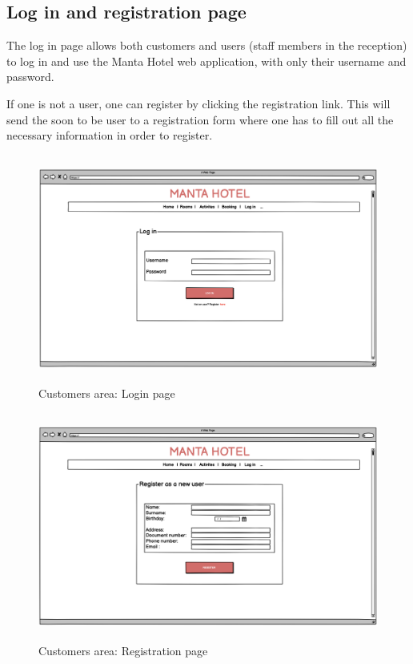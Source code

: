 \subsection{Log in and registration page}
\par The log in page allows both customers and users (staff members in the reception) to log in and use the Manta Hotel web application, with only their username and password. 
\par If one is not a user, one can register by clicking the registration link. This will send the soon to be user to a registration form where one has to fill out all the necessary information in order to register. 
\begin{figure}[H]
	\centering
	\includegraphics[height=7.5cm]{images/HomePage_Login.png} 
	\caption{Customers area: Login page}
\end{figure}
\begin{figure}[H]
	\centering
	\includegraphics[height=7.5cm]{images/HomePage_Register.png} 
	\caption{Customers area: Registration page}
\end{figure}
